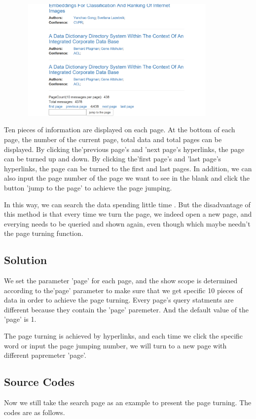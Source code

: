 \documentclass{book}
\begin{document}
\begin{figure}[H]
\centering
\includegraphics[height=6.0cm,width=10.0cm]{img/dsw_11.png}

\end{figure}
Ten pieces of information are displayed on each page. At the bottom of each page, the number of the current page, total data and total pages can be displayed. By clicking the'previous page's and 'next page's hyperlinks, the page can be turned up and down. By clicking the'first page's and 'last page's hyperlinks, the page can be turned to the first and last pages. In addition, we can also input the page number of the page we want to see in the blank and click the button 'jump to the page' to achieve the page jumping.

In this way, we can search the data spending little time . But the disadvantage of this method is that every time we turn the page, we indeed open a new page, and everying needs to be queried and shown again, even though which maybe needn't the page turning function.

\subsection{Solution}

We set the parameter 'page' for each page, and the show scope is determined according to the'page' parameter to make sure that we get specific 10 pieces of data in order to achieve the page turning. Every page's query statments are different because they contain the 'page' paremeter. And the default value of the 'page' is 1.

The page turning is achieved by hyperlinks, and each time we click the specific word or input the page jumping number, we will turn to a new page with different papremeter 'page'.

\subsection{Source Codes}
Now we still take the search page as an example to present the page turning.  The codes are as follows.
\end{document}
